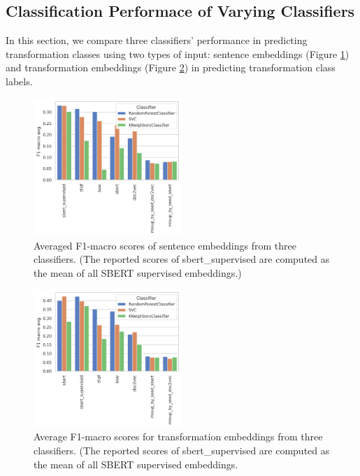 \documentclass[11pt]{article}
\begin{document}
\subsection{Classification Performace of Varying Classifiers}

In this section, we compare three classifiers' performance in predicting transformation classes using two types of input: sentence embeddings (Figure \ref{fig:cls_gs_no_context_embed_comparison}) and transformation embeddings  (Figure \ref{fig:cls_gs_diff_embed_comparison}) in predicting transformation class labels.

\begin{figure}[htp]
  \centering
  \includegraphics[width=0.5\textwidth]{./figs/cls_gs_no_context_embed_comparison.png}
  \caption{Averaged F1-macro scores of sentence embeddings from three classifiers. (The
  reported scores of  {sbert\_supervised} are computed as the mean
  of all SBERT supervised
embeddings.)}\label{fig:cls_gs_no_context_embed_comparison}
\end{figure}
\begin{figure}[htp]
  \centering
  \includegraphics[width=0.5\textwidth]{figs/cls_gs_diff_embed_comparison.png}
  \caption{Average F1-macro scores for transformation embeddings from three classifiers.
  (The reported scores of  {sbert\_supervised} are computed as the mean of all
  SBERT supervised embeddings.
  }\label{fig:cls_gs_diff_embed_comparison}
\end{figure}
\end{document}
